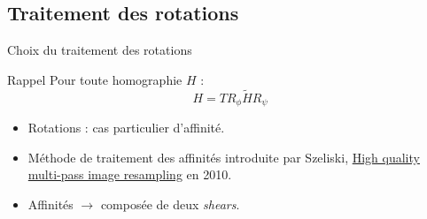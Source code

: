 \documentclass[c,12pt]{beamer}
\newcommand{\ra}[0]{\rightarrow}
\newcommand{\blo}[2]{\begin{block}{#1} #2 \end{block}}
\begin{document}
\subsection{Traitement des rotations}

\begin{frame}{Choix du traitement des rotations}

\blo{Rappel}{Pour toute homographie $H$ : \[H = T R_\phi \tilde H R_\psi\]}
\begin{itemize}
\item Rotations : cas particulier d'affinité. 
\item Méthode de traitement des affinités introduite par Szeliski, \underline{High quality multi-pass image resampling} en 2010.
\item Affinités $\ra$ composée de deux \emph{shears}.
\end{itemize}
\end{frame}
\end{document}
